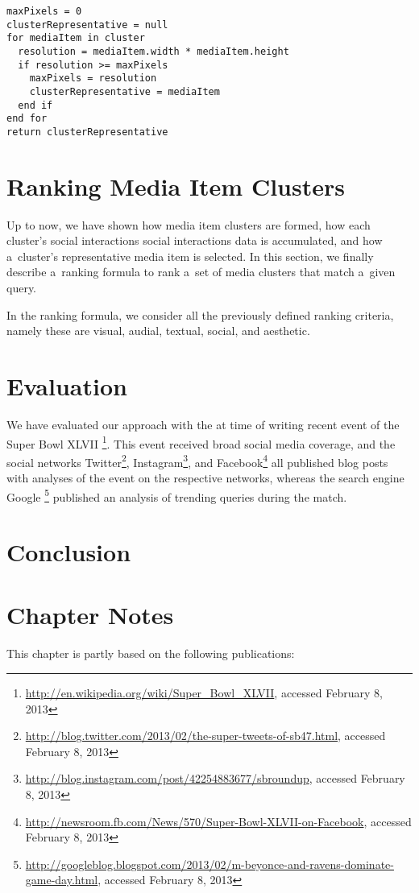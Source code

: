 \begin{lstlisting}[caption=Pseudocode of the cluster representative selection algorithm,
  label=code:clusterrepresentative, float]
maxPixels = 0
clusterRepresentative = null
for mediaItem in cluster
  resolution = mediaItem.width * mediaItem.height
  if resolution >= maxPixels
    maxPixels = resolution
    clusterRepresentative = mediaItem
  end if  
end for
return clusterRepresentative     
\end{lstlisting}

\section{Ranking Media Item Clusters}

Up to now, we have shown how media item clusters are formed,
how each cluster's social interactions social interactions data is accumulated,
and how a~cluster's representative media item is selected.
In this section, we finally describe a~ranking formula to rank
a~set of media clusters that match a~given query.

In the ranking formula, we consider all the previously defined ranking criteria,
namely these are visual, audial, textual, social, and aesthetic.

\section{Evaluation}

We have evaluated our approach with the at time of writing
recent event of the Super Bowl XLVII%
\footnote{\url{http://en.wikipedia.org/wiki/Super_Bowl_XLVII},
accessed February 8, 2013}.
This event received broad social media coverage, and the social networks
Twitter\footnote{\url{http://blog.twitter.com/2013/02/the-super-tweets-of-sb47.html},
accessed February 8, 2013},
Instagram\footnote{\url{http://blog.instagram.com/post/42254883677/sbroundup},
accessed February 8, 2013}, and
Facebook\footnote{\url{http://newsroom.fb.com/News/570/Super-Bowl-XLVII-on-Facebook},
accessed February 8, 2013} all published blog posts with analyses of the event
on the respective networks,
whereas the search engine Google%
\footnote{\url{http://googleblog.blogspot.com/2013/02/m-beyonce-and-ravens-dominate-game-day.html},
accessed February 8, 2013}
published an analysis of trending queries during the match.




\section{Conclusion}

\section*{Chapter Notes}
This chapter is partly based on the following publications:

